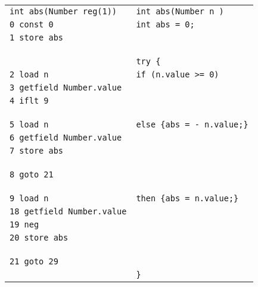   \begin{figure}[ht!]
\begin{frameit}
  \scriptsize{
  \begin{tabular}{ll}
\lstinline!int abs(Number reg(1))!    & \lstinline!int abs(Number n )! \\
				     
\lstinline!0 const 0!                 &  \lstinline!int abs = 0;!\\
\lstinline!1 store abs!		      & \\ 
				      & \\ &\\ &\\
				      & \lstinline!try {!\\
\lstinline!2 load n!                  & \Myspace \lstinline!if (n.value >= 0)!\\
\lstinline!3 getfield Number.value! & \\
\lstinline!4 iflt 9!                  & \\
                                      & \\ &\\ &\\
\lstinline!5 load n!                  & \Myspace\Myspace\lstinline!else {abs = - n.value;}!\\			
\lstinline!6 getfield Number.value! & \\
\lstinline!7 store abs!                 & \\
                                      & \\ &\\ &\\
\lstinline!8 goto 21!		      & \\
                                      & \\ &\\ &\\
\lstinline!9 load n!		      & \Myspace\Myspace\lstinline!then {abs = n.value;}!\\
\lstinline!18 getfield Number.value!& \\
\lstinline!19 neg!                   & \\
\lstinline!20 store abs!		      & \\
                                      & \\ &\\ &\\
\lstinline!21 goto 29!		      & \\
                                      & \lstinline!}!\\

\end{tabular}}
\end{frameit}
\end{figure}
